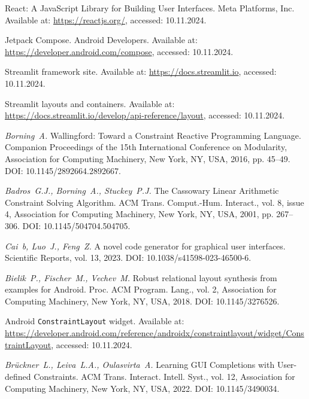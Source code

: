 React: A JavaScript Library for Building User Interfaces. Meta Platforms, Inc. Available at: \url{https://reactjs.org/}, accessed: 10.11.2024.

Jetpack Compose. Android Developers. Available at: \url{https://developer.android.com/compose}, accessed: 10.11.2024.


Streamlit framework site. Available at: \url{https://docs.streamlit.io}, accessed: 10.11.2024.


Streamlit layouts and containers. Available at: \url{https://docs.streamlit.io/develop/api-reference/layout}, accessed: 10.11.2024.

{\em Borning~A.} Wallingford: Toward a Constraint Reactive Programming Language. Companion Proceedings of the 15th International Conference on Modularity, Association for Computing Machinery, New York, NY, USA, 2016, pp. 45--49. DOI: 10.1145/2892664.2892667.

{\em Badros~G.J., Borning~A., Stuckey~P.J.} The Cassowary Linear Arithmetic Constraint Solving Algorithm. ACM Trans. Comput.-Hum. Interact., vol. 8, issue 4, Association for Computing Machinery, New York, NY, USA, 2001, pp. 267--306. DOI: 10.1145/504704.504705.

{\em Cai~b, Luo~J., Feng~Z.} A novel code generator for graphical user interfaces. Scientific Reports, vol. 13, 2023. DOI: 10.1038/s41598-023-46500-6.

{\em Bielik~P., Fischer~M., Vechev~M.} Robust relational layout synthesis from examples for Android. Proc. ACM Program. Lang., vol. 2, Association for Computing Machinery, New York, NY, USA, 2018. DOI: 10.1145/3276526.

\choicelang{}{ \newpage }

Android \texttt{ConstraintLayout} widget. Available at: \url{https://developer.android.com/reference/androidx/constraintlayout/widget/ConstraintLayout}, accessed: 10.11.2024.

{\em Br\"{u}ckner~L., Leiva~L.A., Oulasvirta~A.} Learning GUI Completions with User-defined Constraints. ACM Trans. Interact. Intell. Syst., vol. 12, Association for Computing Machinery, New York, NY, USA, 2022. DOI: 10.1145/3490034.

